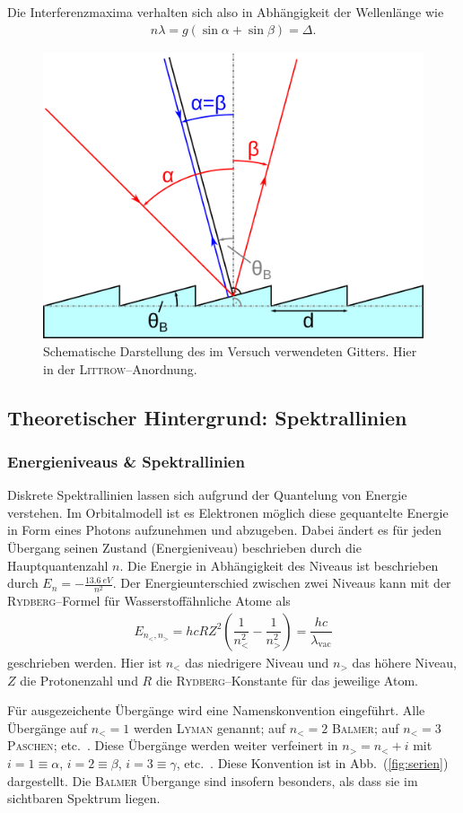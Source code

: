 \documentclass[sn-mathphys-num,iicol]{sn-jnl}
\theoremstyle{thmstyleone}
\theoremstyle{thmstyletwo}
\theoremstyle{thmstylethree}
\begin{document}
Die Interferenzmaxima verhalten sich also in Abhängigkeit der Wellenlänge wie
\begin{align} 
        n \lambda =g\left(\sin \alpha +\sin \beta \right)=\Delta 
.\end{align} 
\begin{figure}[t]
        \centering
        \includegraphics[width=.5\textwidth]{402_stufengitter.png}
        \caption{Schematische Darstellung des im Versuch verwendeten Gitters. Hier in der \textsc{Littrow}--Anordnung.\cite{WikipediaBlazegitter}} \label{fig:blazegitter}
\end{figure}

\subsection{Theoretischer Hintergrund: Spektrallinien}
\subsubsection{Energieniveaus \& Spektrallinien}
Diskrete Spektrallinien lassen sich aufgrund der Quantelung von Energie verstehen.
Im Orbitalmodell ist es Elektronen möglich diese gequantelte Energie in Form eines Photons aufzunehmen und abzugeben.
Dabei ändert es für jeden Übergang seinen Zustand (Energieniveau) beschrieben durch die Hauptquantenzahl $n$.
Die Energie in Abhängigkeit des Niveaus ist beschrieben durch $E_n=-\tfrac{\SI{13.6}{eV}}{n^2}$.
Der Energieunterschied zwischen zwei Niveaus kann mit der \textsc{Rydberg}--Formel für Wasserstoffähnliche Atome als 
\begin{align} 
        E_{n_<,n_>}=hcRZ^2\left(\dfrac{1}{n_<^2}-\dfrac{1}{n_>^2}\right)=\dfrac{hc}{\lambda _\text{vac}}
\end{align} 
geschrieben werden.
Hier ist $n_<$ das niedrigere Niveau und $n_>$ das höhere Niveau, $Z$ die Protonenzahl und $R$ die \textsc{Rydberg}--Konstante für das jeweilige Atom.

Für ausgezeichente Übergänge wird eine Namenskonvention eingeführt.
Alle Übergänge auf $n_<=1$ werden \textsc{Lyman} genannt; auf $n_<=2$ \textsc{Balmer}; auf $n_<=3$ \textsc{Paschen}; etc.\ .
Diese Übergänge werden weiter verfeinert in $n_>=n_<+i$ mit $i=1\equiv \alpha $, $i=2\equiv \beta $, $i=3\equiv \gamma $, etc.\ .
Diese Konvention ist in Abb.\ (\ref{fig:serien}) dargestellt.
Die \textsc{Balmer} Übergange sind insofern besonders, als dass sie im sichtbaren Spektrum liegen.
\end{document}
